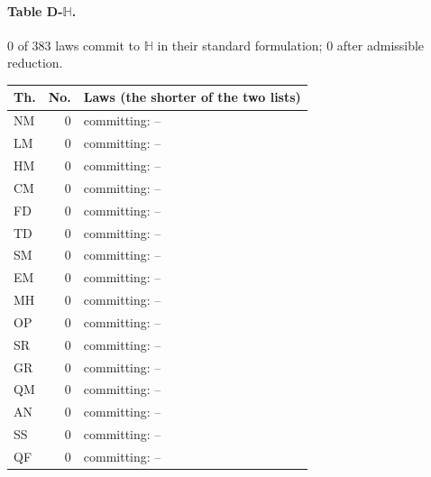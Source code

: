 \paragraph{Table D-$\mathbb H$.} 0 of 383 laws commit to $\mathbb H$ in their standard formulation; 0 after admissible reduction.
{\scriptsize\setlength{\tabcolsep}{3pt}
\begin{longtable}{l r p{12.2cm}}
\toprule
Th. & No. & Laws (the shorter of the two lists) \\
\midrule
\endhead
\bottomrule\endfoot
NM & 0 & committing: -- \\
LM & 0 & committing: -- \\
HM & 0 & committing: -- \\
CM & 0 & committing: -- \\
FD & 0 & committing: -- \\
TD & 0 & committing: -- \\
SM & 0 & committing: -- \\
EM & 0 & committing: -- \\
MH & 0 & committing: -- \\
OP & 0 & committing: -- \\
SR & 0 & committing: -- \\
GR & 0 & committing: -- \\
QM & 0 & committing: -- \\
AN & 0 & committing: -- \\
SS & 0 & committing: -- \\
QF & 0 & committing: -- \\
\end{longtable}
}
